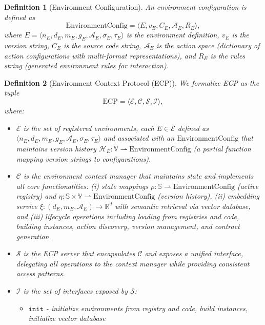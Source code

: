 \documentclass[11pt]{article}
\newtheorem{definition}{Definition}
\begin{document}
  \begin{definition}[Environment Configuration]
  An environment configuration is defined as
  \[ \mathrm{EnvironmentConfig} = \langle E, v_E, C_E, \mathcal{A}_E, R_E \rangle, \]
  where $E = \langle n_E, d_E, m_E, g_E, \mathcal{A}_E, \sigma_E, \tau_E \rangle$ is the environment definition, $v_E$ is the version string, $C_E$ is the source code string, $\mathcal{A}_E$ is the action space (dictionary of action configurations with multi-format representations), and $R_E$ is the rules string (generated environment rules for interaction).
\end{definition}

\begin{definition}[Environment Context Protocol (ECP)]
We formalize ECP as the tuple
  \[ \mathrm{ECP} = \langle \mathcal{E}, \mathcal{C}, \mathcal{S}, \mathcal{I} \rangle, \]
where:
\begin{itemize}[leftmargin=*,itemsep=0.1em]
    \item $\mathcal{E}$ is the set of registered environments, each $E \in \mathcal{E}$ defined as $\langle n_E, d_E, m_E, g_E, \mathcal{A}_E, \sigma_E, \tau_E \rangle$ and associated with an $\mathrm{EnvironmentConfig}$ that maintains version history $\mathcal{H}_E: \mathbb{V} \rightharpoonup \mathrm{EnvironmentConfig}$ (a partial function mapping version strings to configurations).
    \item $\mathcal{C}$ is the environment context manager that maintains state and implements all core functionalities: (i) state mappings $\rho: \mathbb{S} \rightharpoonup \mathrm{EnvironmentConfig}$ (active registry) and $\eta: \mathbb{S} \times \mathbb{V} \rightharpoonup \mathrm{EnvironmentConfig}$ (version history), (ii) embedding service $\xi: (d_E, m_E, \mathcal{A}_E) \to \mathbb{R}^d$ with semantic retrieval via vector database, and (iii) lifecycle operations including loading from registries and code, building instances, action discovery, version management, and contract generation.
    \item $\mathcal{S}$ is the ECP server that encapsulates $\mathcal{C}$ and exposes a unified interface, delegating all operations to the context manager while providing consistent access patterns.
    \item $\mathcal{I}$ is the set of interfaces exposed by $\mathcal{S}$:
    \begin{itemize}[leftmargin=*,itemsep=0.05em]
      \item $\mathtt{init}$ - initialize environments from registry and code, build instances, initialize vector database

\end{itemize}
\end{itemize}
\end{definition}
\end{document}
